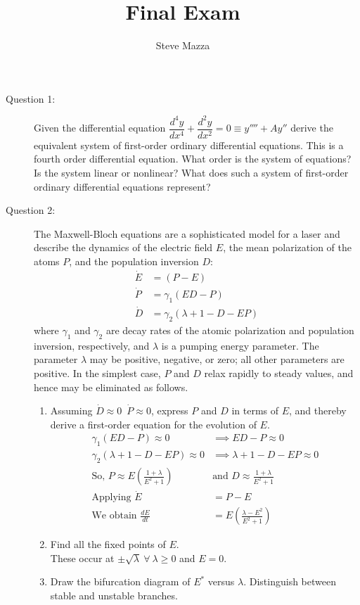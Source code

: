 \documentclass[letterpaper,10pt]{article}
\title{Final Exam}
\author{Steve Mazza}
\begin{document}
\maketitle

\begin{description}
\item[Question 1:]
Given the differential equation $\dfrac{d^4y}{dx^4}+\dfrac{d^2y}{dx^2}=0\equiv y''''+Ay''$ derive the equivalent system of first-order ordinary differential equations.  This is a fourth order differential equation.  What order is the system of equations?  Is the system linear or nonlinear?  What does such a system of first-order ordinary differential equations represent?


\item[Question 2:]
The Maxwell-Bloch equations are a sophisticated model for a laser and describe the dynamics of the electric field $E$, the mean polarization of the atoms $P$, and the population inversion $D$:
\begin{align*}
\dot{E} &= (P-E) \\
\dot{P} &= \gamma_1(ED-P) \\
\dot{D} &= \gamma_2(\lambda+1-D-EP)
\end{align*}
where $\gamma_1$ and $\gamma_2$ are decay rates of the atomic polarization and population inversion, respectively, and $\lambda$ is a pumping energy parameter.  The parameter $\lambda$ may be positive, negative, or zero; all other parameters are positive.  In the simplest case, $P$ and $D$ relax rapidly to steady values, and hence may be eliminated as follows.
\begin{enumerate}
\item Assuming $\dot{D}\approx 0$\ $\dot{P}\approx 0$, express $P$ and $D$ in terms of $E$, and thereby derive a first-order equation for the evolution of $E$.
\begin{align*}
	\gamma_1(ED-P)\approx0 &\implies ED-P\approx0 \\
	\gamma_2(\lambda+1-D-EP)\approx0 &\implies \lambda+1-D-EP\approx0 \\
	\mbox{So,\ } P\approx E\left(\frac{1+\lambda}{E^2+1}\right) &\mbox{and\ } D\approx\frac{1+\lambda}{E^2+1} \\
	\mbox{Applying\ } \dot{E} &= P-E \\ 
	\mbox{We obtain\ } \frac{dE}{dt} &= E\left(\frac{\lambda-E^2}{E^2+1}\right)
\end{align*}
\item Find all the fixed points of $E$.  \\ These occur at $\pm\sqrt{\lambda}\ \forall\ \lambda\geq0$ and $E=0$.
\item Draw the bifurcation diagram of $E^*$ versus $\lambda$.  Distinguish between stable and unstable branches.
\end{enumerate}


\end{description}
\end{document}
